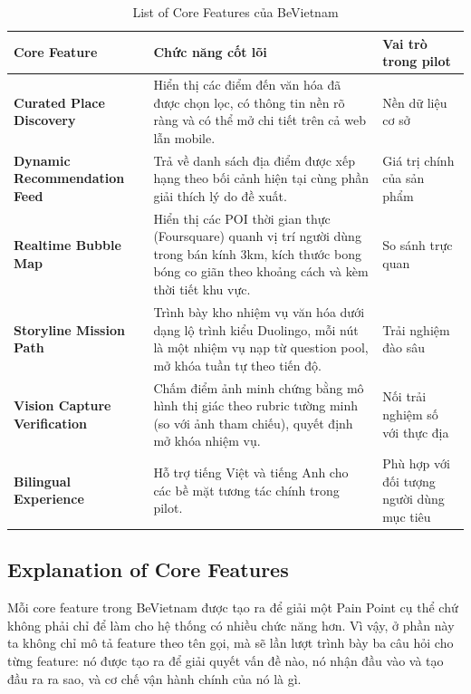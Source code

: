 \begin{table}[H]
\centering
\caption{List of Core Features của BeVietnam}
\label{tab:core_features}
\begin{tabularx}{\textwidth}{>{\raggedright\arraybackslash}p{3.2cm} X >{\raggedright\arraybackslash}p{2.2cm}}
\toprule
\textbf{Core Feature} & \textbf{Chức năng cốt lõi} & \textbf{Vai trò trong pilot} \\
\midrule
\textbf{Curated Place Discovery} & Hiển thị các điểm đến văn hóa đã được chọn lọc, có thông tin nền rõ ràng và có thể mở chi tiết trên cả web lẫn mobile. & Nền dữ liệu cơ sở \\
\textbf{Dynamic Recommendation Feed} & Trả về danh sách địa điểm được xếp hạng theo bối cảnh hiện tại cùng phần giải thích lý do đề xuất. & Giá trị chính của sản phẩm \\
\textbf{Realtime Bubble Map} & Hiển thị các POI thời gian thực (Foursquare) quanh vị trí người dùng trong bán kính 3km, kích thước bong bóng co giãn theo khoảng cách và kèm thời tiết khu vực. & So sánh trực quan \\
\textbf{Storyline Mission Path} & Trình bày kho nhiệm vụ văn hóa dưới dạng lộ trình kiểu Duolingo, mỗi nút là một nhiệm vụ nạp từ question pool, mở khóa tuần tự theo tiến độ. & Trải nghiệm đào sâu \\
\textbf{Vision Capture Verification} & Chấm điểm ảnh minh chứng bằng mô hình thị giác theo rubric tường minh (so với ảnh tham chiếu), quyết định mở khóa nhiệm vụ. & Nối trải nghiệm số với thực địa \\
\textbf{Bilingual Experience} & Hỗ trợ tiếng Việt và tiếng Anh cho các bề mặt tương tác chính trong pilot. & Phù hợp với đối tượng người dùng mục tiêu \\
\bottomrule
\end{tabularx}
\end{table}

\subsection{Explanation of Core Features}
\contrib

Mỗi core feature trong BeVietnam được tạo ra để giải một Pain Point cụ
thể chứ không phải chỉ để làm cho hệ thống có nhiều chức năng hơn. Vì
vậy, ở phần này ta không chỉ mô tả feature theo tên gọi, mà sẽ lần lượt
trình bày ba câu hỏi cho từng feature: nó được tạo ra để giải quyết vấn
đề nào, nó nhận đầu vào và tạo đầu ra ra sao, và cơ chế vận hành chính
của nó là gì.

